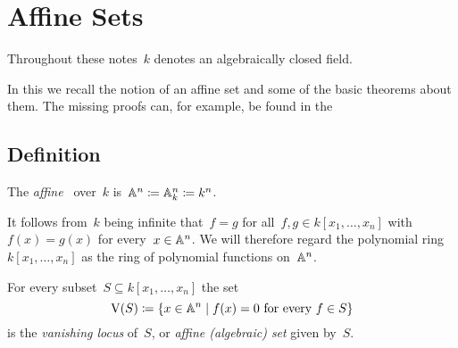 \section{Affine Sets}
\label{affine sets}


\begin{conventions}
  Throughout these notes~$k$ denotes an algebraically closed field.
\end{conventions}


\begin{fluff}
  In this  we recall the notion of an affine set and some of the basic theorems about them.
  The missing proofs can, for example, be found in the \cite{algebra1notes}
\end{fluff}





\subsection{Definition}


\begin{definition}
  The \emph{affine~} over~$k$ is~$\mathbb{A}^n \coloneqq \mathbb{A}^n_k \coloneqq k^n$.
\end{definition}


\begin{fluff}
  It follows from~$k$ being infinite that~$f = g$ for all~$f, g \in k[x_1, \dotsc, x_n]$ with~$f(x) = g(x)$ for every~$x \in \mathbb{A}^n$.
  We will therefore regard the polynomial ring~$k[x_1, \dotsc, x_n]$ as the ring of polynomial functions on~$\mathbb{A}^n$.
\end{fluff}


\begin{definition}
  \label{definition of affine sets}
  For every subset~$S \subseteq k[x_1, \dotsc, x_n]$ the set
  \[
              \vset(S)
    \defined  \{
                x \in \Aff^n
              \suchthat
                \text{$f(x) = 0$ for every~$f \in S$}
              \}
  \]
  is the \emph{vanishing locus} of~$S$, or \emph{affine \textup(algebraic\textup) set} given by~$S$.
\end{definition}


